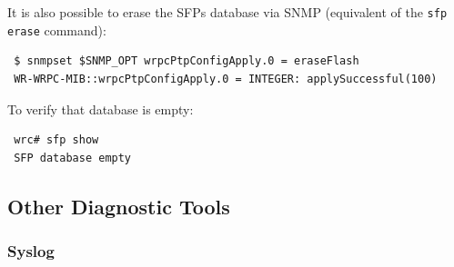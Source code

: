 \documentclass[a4paper, 12pt]{article}
\begin{document}
It is also possible to erase the SFPs database via SNMP (equivalent of
the \texttt{sfp erase} command):
\begin{lstlisting}
 $ snmpset $SNMP_OPT wrpcPtpConfigApply.0 = eraseFlash
 WR-WRPC-MIB::wrpcPtpConfigApply.0 = INTEGER: applySuccessful(100)
\end{lstlisting}

To verify that database is empty:
\begin{lstlisting}
 wrc# sfp show
 SFP database empty
\end{lstlisting}

\subsection{Other Diagnostic Tools}
\label{Other Diagnostic Tools}

\subsubsection{Syslog}
\label{Syslog}
\end{document}
